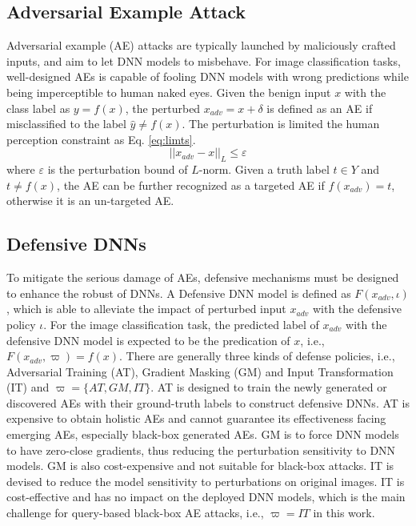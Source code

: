 \documentclass[lettersize,journal]{IEEEtran}
\begin{document}
\subsection{Adversarial Example Attack}	
Adversarial example (AE) attacks are typically launched by maliciously crafted inputs, and aim to let DNN models to misbehave. For image classification tasks, well-designed AEs is capable of fooling DNN models with wrong predictions while being imperceptible to human naked eyes. Given the benign input $x$ with the class label as $y=f(x)$, the perturbed $x_{adv} = x + \delta$ is defined as an AE if misclassified to the label $\hat{y} \neq f(x)$. The perturbation is limited the human perception constraint as Eq. \ref{eq:limts}.
\begin{equation}
|| x_{adv} - x||_L \leq \varepsilon
\label{eq:limts}
\end{equation}
where $\varepsilon$ is the perturbation bound of $L$-norm. 
Given a truth label $t \in Y$ and $t \neq f(x)$, the AE can be further recognized as a targeted AE if $f(x_{adv})=t$, otherwise it is an un-targeted AE. %
\subsection{Defensive DNNs}	
To mitigate the serious damage of AEs, defensive mechanisms must be designed to enhance the robust of DNNs. A Defensive DNN model is defined as $F(x_{adv}, \iota)$, which is able to alleviate the impact of perturbed input $x_{adv}$ with the defensive policy $\iota$. For the image classification task, the predicted label of $x_{adv}$ with the defensive DNN model is expected to be the predication of $x$, i.e., $F(x_{adv}, \varpi) = f(x)$.  
There are generally three kinds of defense policies, i.e., Adversarial Training (AT), Gradient Masking (GM) and Input Transformation (IT) and $\varpi=\{AT, GM, IT\}$. AT is designed to train the newly generated or discovered AEs with their ground-truth labels to construct defensive DNNs. AT is expensive to obtain holistic AEs and cannot guarantee its effectiveness facing emerging AEs, especially black-box generated AEs. GM is to force DNN models to have zero-close gradients, thus reducing the perturbation sensitivity to DNN models. GM is also cost-expensive and not suitable for black-box attacks. IT is devised to reduce the model sensitivity to perturbations on original images. IT is cost-effective and has no impact on the deployed DNN models, which is the main challenge for query-based black-box AE attacks, i.e., $\varpi={IT}$ in this work.
\end{document}

